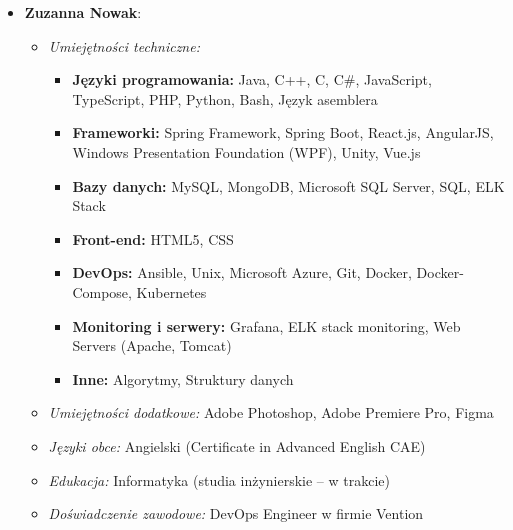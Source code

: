 \documentclass[12pt,a4paper,colorlinks=true,linkcolor=NavyBlue,citecolor=red,urlcolor=NavyBlue]{book}
\begin{document}
\begin{itemize}
  \item \textbf{Zuzanna Nowak}:
    \begin{itemize}
        \item \textit{Umiejętności techniczne:} 
        \begin{itemize}
            \item \textbf{Języki programowania:} Java, C++, C, C\#, JavaScript, TypeScript, PHP, Python, Bash, Język asemblera
            \item \textbf{Frameworki:} Spring Framework, Spring Boot, React.js, AngularJS, Windows Presentation Foundation (WPF), Unity, Vue.js
            \item \textbf{Bazy danych:} MySQL, MongoDB, Microsoft SQL Server, SQL, ELK Stack
            \item \textbf{Front-end:} HTML5, CSS
            \item \textbf{DevOps:} Ansible, Unix, Microsoft Azure, Git, Docker, Docker-Compose, Kubernetes
            \item \textbf{Monitoring i serwery:} Grafana, ELK stack monitoring, Web Servers (Apache, Tomcat)
            \item \textbf{Inne:} Algorytmy, Struktury danych
        \end{itemize}
        \item \textit{Umiejętności dodatkowe:} Adobe Photoshop, Adobe Premiere Pro, Figma
        \item \textit{Języki obce:} Angielski (Certificate in Advanced English CAE)
        \item \textit{Edukacja:} Informatyka (studia inżynierskie – w trakcie)
        \item \textit{Doświadczenie zawodowe:} DevOps Engineer w firmie Vention
    \end{itemize}
    

\end{itemize}
\end{document}

